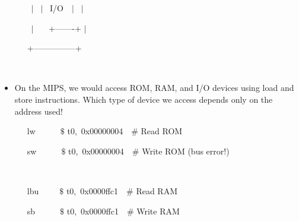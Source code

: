 \documentclass[12pt]{article}
\begin{document}
\begin{itemize}
 \tabto{0.64in}  \tabto{1.27in} {\fontsize{10pt}{12.0pt}\selectfont  \tabto{1.91in} \ \ \ \ $ \vert $ \   $ \vert $ \  I/O\ \ $ \vert $ \   $ \vert $ \par}\par

 \tabto{0.64in}  \tabto{1.27in} {\fontsize{10pt}{12.0pt}\selectfont  \tabto{1.91in} \ \ \ \ $ \vert $ \ \ \ +-------+   $ \vert $ \par}\par

 \tabto{0.64in}  \tabto{1.27in} {\fontsize{10pt}{12.0pt}\selectfont  \tabto{1.91in} \ \ \  +---------------+\par}\par

{\fontsize{10pt}{12.0pt}\selectfont  \tabto{0.64in} \ \ \  \par}\par

\setlength{\parskip}{5.04pt}
	\item {\fontsize{13pt}{15.6pt}\selectfont On the MIPS, we would access ROM, RAM, and I/O devices using load and store instructions. Which type of device we access depends only on the address used!\par}\par

\setlength{\parskip}{0.0pt}
{\fontsize{10pt}{12.0pt}\selectfont  \tabto{0.64in} \ \ \  lw\ \ \ \ \ \ $\$$ t0,\ 0x00000004\ \    $\#$  Read ROM\par}\par

{\fontsize{10pt}{12.0pt}\selectfont  \tabto{0.64in} \ \ \  sw\ \ \ \ \ \ $\$$ t0,\ 0x00000004\ \    $\#$  Write ROM (bus error!)\par}\par

{\fontsize{10pt}{12.0pt}\selectfont  \tabto{0.64in} \ \ \  \par}\par

{\fontsize{10pt}{12.0pt}\selectfont  \tabto{0.64in} \ \ \  lbu\ \ \ \ \ $\$$ t0,\ 0x0000ffc1\ \    $\#$  Read RAM\par}\par

{\fontsize{10pt}{12.0pt}\selectfont  \tabto{0.64in} \ \ \  sb\ \ \ \ \ \ $\$$ t0,\ 0x0000ffc1\ \    $\#$  Write RAM\par}\par

{\fontsize{10pt}{12.0pt}\selectfont  \tabto{0.64in} \ \ \  \par}\par


\end{itemize}
\end{document}
